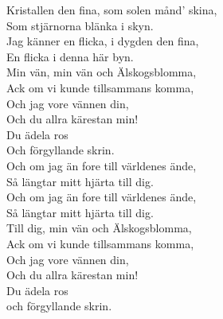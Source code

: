 \documentclass[a6paper, 10pt, twoside]{article}
\begin{document}
\noindent
\begin{center}
\end{center}
\begin{lyrics}
Kristallen den fina, som solen månd' skina,\\
Som stjärnorna blänka i skyn.\\
Jag känner en flicka, i dygden den fina,\\
En flicka i denna här byn.
\vspace{5pt}\\
Min vän, min vän och Älskogsblomma,\\
Ack om vi kunde tillsammans komma,\\
Och jag vore vännen din,\\
Och du allra kärestan min!\\
Du ädela ros\\
Och förgyllande skrin.
\vspace{5pt}\\
Och om jag än fore till världenes ände,\\
Så längtar mitt hjärta till dig.\\
Och om jag än fore till världenes ände,\\
Så längtar mitt hjärta till dig.
\vspace{5pt}\\
Till dig, min vän och Älskogsblomma,\\
Ack om vi kunde tillsammans komma,\\
Och jag vore vännen din,\\
Och du allra kärestan min!\\
Du ädela ros\\
och förgyllande skrin. 
\end{lyrics}
\end{document}
